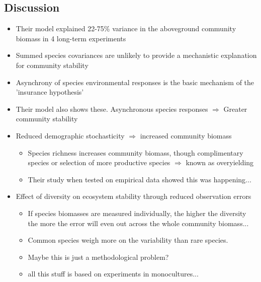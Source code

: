 \subsection*{Discussion}
\begin{itemize}
	\item Their model explained 22-75\% variance in the aboveground community biomass in 4 long-term experiments
	\item Summed species covariances are unlikely to provide a mechanistic explanation for community stability
	\item Asynchrony of species environmental responses is the basic mechanism of the 'insurance hypothesis'
	\item Their model also shows these. Asynchronous species responses $\Rightarrow$ Greater community stability
	\item Reduced demographic stochasticity $\Rightarrow$ increased community biomass
	\begin{itemize}
		\item Species richness increases community biomass, though complimentary species or selection of more productive species $\Rightarrow$ known as overyielding
		\item Their study when tested on empirical data showed this was happening...
	\end{itemize}
	\item Effect of diversity on ecosystem stability through reduced observation errors
	\begin{itemize}
		\item If species biomasses are measured individually, the higher the diversity the more the error will even out across the whole community biomass...
		\item Common species weigh more on the variability than rare species.
		\item Maybe this is just a methodological problem?
		\item all this stuff is based on experiments in monocultures...
	\end{itemize}
\end{itemize}